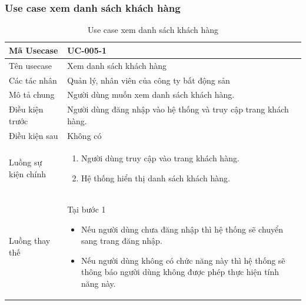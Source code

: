 \documentclass[12pt,a4paper]{article}
\begin{document}
    \subsubsection*{Use case xem danh sách khách hàng }
    \begin{table}[H]
        \centering
        \begin{tabular}{|p{3.5cm}|p{11.5cm}|c|}
            \hline
            Mã Usecase      & UC-005-1                                                        \\
            \hline
            Tên usecase     & Xem danh sách khách hàng                                        \\
            \hline
            Các tác nhân    & Quản lý, nhân viên của công ty bất động sản                     \\
            \hline
            Mô tả chung     & Người dùng muốn xem danh sách khách hàng.                       \\
            \hline

            Điều kiện trước & Người dùng đăng nhập vào hệ thống và truy cập trang khách hàng. \\
            \hline

            Điều kiện sau   & Không có                                                        \\
            \hline

            Luồng sự kiện chính & \vspace{-.8cm}\begin{enumerate}
                                                    \item Người dùng truy cập vào trang khách hàng.
                                                    \item Hệ thống hiển thị danh sách khách hàng.
            \end{enumerate}
            \\
            \hline
            Luồng thay thế & Tại bước 1\newline
            \vspace{-.8cm}\begin{itemize}
                              \item Nếu người dùng chưa đăng nhập thì hệ thống sẽ chuyển sang trang đăng nhập.
                              \item  Nếu người dùng không có chức năng này thì hệ thống sẽ thông báo người dùng không được phép thực hiện tính năng này.
            \end{itemize}

            \\    \hline
        \end{tabular}
        \caption{Use case xem danh sách khách hàng }
    \end{table}
\end{document}
